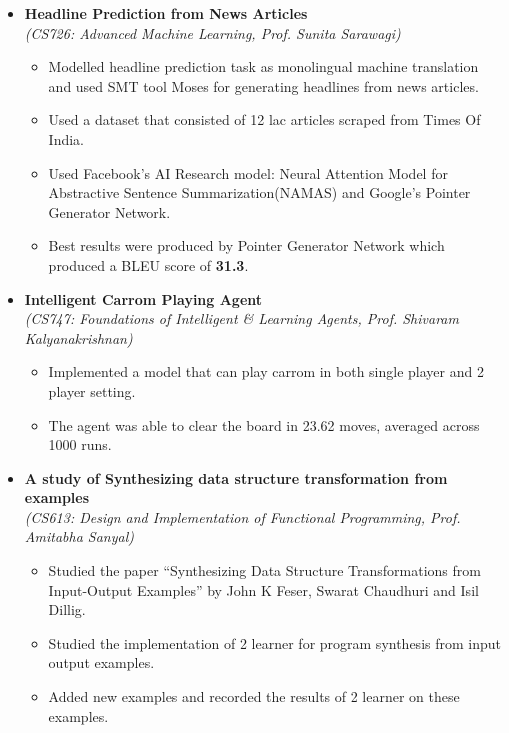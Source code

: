 \documentclass[a4paper,10pt]{article}
\newcommand{\isep}{-2 pt}
\begin{document}
\begin{itemize}

\item \textbf{ Headline Prediction from News Articles} \\ \emph{(CS726: Advanced Machine Learning, Prof. Sunita Sarawagi)}
    \\ [-0.6cm]
    \begin{itemize}\itemsep \isep
    \item Modelled headline prediction task as monolingual machine translation and used SMT tool Moses for generating headlines from news articles.
    \item Used a dataset that consisted of 12 lac articles scraped from Times Of India.
    \item Used Facebook’s AI Research model:  Neural Attention Model for Abstractive Sentence Summarization(NAMAS) and Google’s Pointer Generator Network.
    \item Best results were produced by Pointer Generator Network which produced a BLEU score of \textbf{31.3}.
    \end{itemize}

\item \textbf{Intelligent Carrom Playing Agent}
\\ {\emph{(CS747: Foundations of Intelligent \& Learning Agents, Prof. Shivaram Kalyanakrishnan)}}
    \\ [-0.6cm]
    \begin{itemize}\itemsep \isep
    \item Implemented a model that can play carrom in both single player and 2 player setting.
    \item The agent was able to clear the board in 23.62 moves, averaged across 1000 runs.
    \end{itemize}

\item \textbf{A study of Synthesizing data structure transformation from examples}
\\ {\emph{(CS613: Design and Implementation of Functional Programming, Prof. Amitabha Sanyal)}}
    \\ [-0.6cm]
    \begin{itemize}\itemsep \isep
    \item Studied the paper “Synthesizing Data Structure Transformations from Input-Output Examples” by John K Feser, Swarat Chaudhuri and Isil Dillig.
    \item Studied the implementation of  2 learner for program synthesis from input output examples.
    \item Added new examples and recorded the results of 2 learner on these examples.
    \end{itemize}



\end{itemize}
\end{document}
